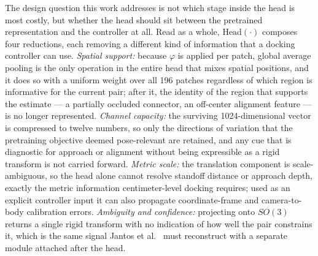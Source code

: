 \documentclass[letterpaper, 10 pt, conference]{IEEEtran}  %
\begin{document}
The design question this work addresses is not which stage inside the head is most costly, but whether the head should sit between the pretrained representation and the controller at all. Read as a whole, $\mathrm{Head}(\cdot)$ composes four reductions, each removing a different kind of information that a docking controller can use. \emph{Spatial support:} because $\varphi$ is applied per patch, global average pooling is the only operation in the entire head that mixes spatial positions, and it does so with a uniform weight over all 196 patches regardless of which region is informative for the current pair; after it, the identity of the region that supports the estimate --- a partially occluded connector, an off-center alignment feature --- is no longer represented. \emph{Channel capacity:} the surviving 1024-dimensional vector is compressed to twelve numbers, so only the directions of variation that the pretraining objective deemed pose-relevant are retained, and any cue that is diagnostic for approach or alignment without being expressible as a rigid transform is not carried forward. \emph{Metric scale:} the translation component is scale-ambiguous, so the head alone cannot resolve standoff distance or approach depth, exactly the metric information centimeter-level docking requires; used as an explicit controller input it can also propagate coordinate-frame and camera-to-body calibration errors. \emph{Ambiguity and confidence:} projecting onto $SO(3)$ returns a single rigid transform with no indication of how well the pair constrains it, which is the same signal Jantos et al.~\cite{jantos2025aleatoric} must reconstruct with a separate module attached after the head.
\end{document}
